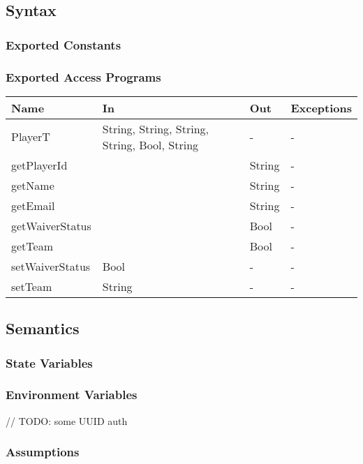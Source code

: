 \documentclass[12pt, titlepage]{article}
\begin{document}
\subsection{Syntax}

\subsubsection{Exported Constants}

\subsubsection{Exported Access Programs}

\begin{center}
  \begin{tabular}{|p{4cm}| p{4cm}| p{4cm} | p{3cm}|}
  \hline
  \textbf{Name} & \textbf{In} & \textbf{Out} & \textbf{Exceptions} \\
  \hline
  PlayerT & String, String, String, String, Bool, String & - & - \\
  getPlayerId &  & String & -\\
  getName &  & String & -\\
  getEmail &  & String & -\\
  getWaiverStatus &  & Bool & -\\
  getTeam &  & Bool & -\\
  setWaiverStatus & Bool & - & -\\
  setTeam & String & - & -\\
  \hline
  \end{tabular}
\end{center}

\subsection{Semantics}

\subsubsection{State Variables}

\subsubsection{Environment Variables}

// TODO: some UUID auth

\subsubsection{Assumptions}
\end{document}
